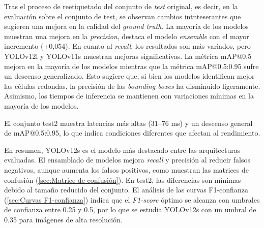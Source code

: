 \documentclass[12pt,a4paper,onecolumn,oneside]{report}
\begin{document}
Tras el proceso de reetiquetado del conjunto de \textit{test} original, es decir, en la evaluación sobre el conjunto de test, se observan cambios intnteserantes que 
sugieren una mejora en la calidad del \textit{ground truth}. La mayoría de los modelos muestran una mejora en la \textit{precision}, destaca el modelo \textit{ensemble} con el mayor incremento (+0,054). 
En cuanto al \textit{recall}, los resultados son más variados, pero YOLOv12l y YOLOv11s muestran mejoras significativas.
La métrica mAP@0.5 mejora en la mayoría de los modelos mientras que la métrica mAP@0.5:0.95 sufre un descenso generalizado. Esto sugiere que, si bien los modelos identifican mejor las células redondas, la precisión de las \textit{bounding boxes} ha disminuido ligeramente.
Asimismo, los tiempos de inferencia se mantienen con variaciones mínimas en la mayoría de los modelos.

El conjunto test2 muestra latencias más altas ($31$–$76$ ms) y un descenso general de mAP@0.5:0.95, lo que indica condiciones diferentes que afectan al rendimiento.

En resumen, YOLOv12s es el modelo más destacado entre las arquitecturas evaluadas. El ensamblado de modelos mejora \textit{recall} y precisión al reducir falsos negativos, aunque aumenta los falsos positivos, como muestran las matrices de confusión 
(\autoref{sec:Matrice de confusión}). En test2, las diferencias son mínimas debido al tamaño reducido del conjunto. El análisis de las curvas F1-confianza 
(\autoref{sec:Curvas F1-confianza}) indica que el \textit{F1-score} óptimo se alcanza con umbrales de confianza entre 0.25 y 0.5, por lo que se estudia YOLOv12s con un umbral de 0.35 
para imágenes de alta resolución.
\end{document}
